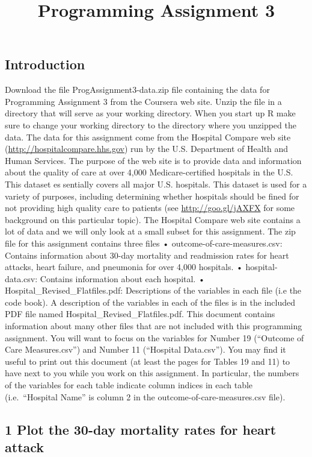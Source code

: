 \documentclass[
]{article}
\title{Programming Assignment 3}
\author{}
\date{\vspace{-2.5em}}
\begin{document}
\maketitle

\subsection{Introduction}\label{introduction}

Download the file ProgAssignment3-data.zip file containing the data for
Programming Assignment 3 from the Coursera web site. Unzip the file in a
directory that will serve as your working directory. When you start up R
make sure to change your working directory to the directory where you
unzipped the data. The data for this assignment come from the Hospital
Compare web site (\url{http://hospitalcompare.hhs.gov}) run by the U.S.
Department of Health and Human Services. The purpose of the web site is
to provide data and information about the quality of care at over 4,000
Medicare-certified hospitals in the U.S. This dataset essentially covers
all major U.S. hospitals. This dataset is used for a variety of
purposes, including determining whether hospitals should be fined for
not providing high quality care to patients (see
\url{http://goo.gl/jAXFX} for some background on this particular topic).
The Hospital Compare web site contains a lot of data and we will only
look at a small subset for this assignment. The zip file for this
assignment contains three files • outcome-of-care-measures.csv: Contains
information about 30-day mortality and readmission rates for heart
attacks, heart failure, and pneumonia for over 4,000 hospitals. •
hospital-data.csv: Contains information about each hospital. •
Hospital\_Revised\_Flatfiles.pdf: Descriptions of the variables in each
file (i.e the code book). A description of the variables in each of the
files is in the included PDF file named
Hospital\_Revised\_Flatfiles.pdf. This document contains information
about many other files that are not included with this programming
assignment. You will want to focus on the variables for Number 19
(``Outcome of Care Measures.csv'') and Number 11 (``Hospital
Data.csv''). You may find it useful to print out this document (at least
the pages for Tables 19 and 11) to have next to you while you work on
this assignment. In particular, the numbers of the variables for each
table indicate column indices in each table (i.e.~``Hospital Name'' is
column 2 in the outcome-of-care-measures.csv file).

\subsection{1 Plot the 30-day mortality rates for heart
attack}\label{plot-the-30-day-mortality-rates-for-heart-attack}
\end{document}
